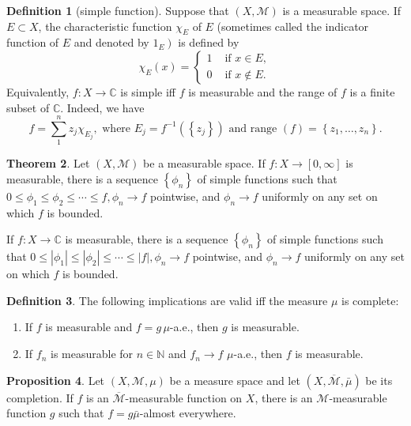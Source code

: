 \documentclass[12pt,a4paper]{book}
\newenvironment{enu}{\begin{enumerate}[(1)]}{\end{enumerate}}
\theoremstyle{definition}
\newtheorem{defn}{Definition}[section]
\newtheorem{theo}[defn]{Theorem}
\newtheorem{prop}[defn]{Proposition}
\begin{document}
\begin{defn}[simple function]
    Suppose that $(X, \mathcal{M})$ is a measurable space. If $E \subset X$, the characteristic function $\chi_E$ of $E$ (sometimes called the indicator function of $E$ and denoted by $\left.1_E\right)$ is defined by
    $$
        \chi_E(x)= \begin{cases}1 & \text { if } x \in E, \\ 0 & \text { if } x \notin E .\end{cases}
    $$
    Equivalently, $f: X \rightarrow \mathbb{C}$ is simple iff $f$ is measurable and the range of $f$ is a finite subset of $\mathbb{C}$. Indeed, we have
    $$
        f=\sum_1^n z_j \chi_{E_j}, \text { where } E_j=f^{-1}\left(\left\{z_j\right\}\right) \text { and range }(f)=\left\{z_1, \ldots, z_n\right\} .
    $$

\end{defn}
\begin{theo}
    Let $(X, \mathcal{M})$ be a measurable space.
    If $f: X \rightarrow[0, \infty]$ is measurable, there is a sequence $\left\{\phi_n\right\}$ of simple functions such that $0 \leq \phi_1 \leq \phi_2 \leq \cdots \leq f, \phi_n \rightarrow f$ pointwise, and $\phi_n \rightarrow f$ uniformly on any set on which $f$ is bounded.

    If $f: X \rightarrow \mathbb{C}$ is measurable, there is a sequence $\left\{\phi_n\right\}$ of simple functions such that $0 \leq\left|\phi_1\right| \leq\left|\phi_2\right| \leq \cdots \leq|f|, \phi_n \rightarrow f$ pointwise, and $\phi_n \rightarrow f$ uniformly on any set on which $f$ is bounded.

    \label{theorem:approximate by simple function}

\end{theo}
\begin{defn}
    The following implications are valid iff the measure $\mu$ is complete:
    \begin{enu}
        \item If $f$ is measurable and $f=g\, \mu$-a.e., then $g$ is measurable.

        \item If $f_n$ is measurable for $n \in \mathbb{N}$ and $f_n \rightarrow f$ $\mu$-a.e., then $f$ is measurable.
    \end{enu}
\end{defn}
\begin{prop}
    Let $(X, \mathcal{M}, \mu)$ be a measure space and let $(X, \overline{\mathcal{M}}, \bar{\mu})$ be its completion. 
    If $f$ is an $\overline{\mathcal{M}}$-measurable function on $X$, there is an $\mathcal{M}$-measurable function $g$ such that $f=g \bar{\mu}$-almost everywhere.
\end{prop}
\end{document}

